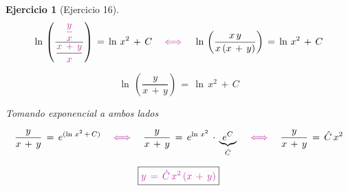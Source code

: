 \documentclass[a4paper,11pt,openany]{book}
\newtheorem{ejer}{Ejercicio}[section]
\begin{document}
\begin{ejer}[Ejercicio 16]
$$\ln\,\left(\dfrac{\textcolor{byzantine}{\dfrac{y}{x}}}{\dfrac{\textcolor{byzantine}{x\,+\,y} }{\textcolor{byzantine}{x}} } \right)\,=\,\ln\,x^{2}\,+\,C \quad \textcolor{byzantine}{\iff} \quad \ln\,\left(\dfrac{x\,y}{x\,(x\,+\,y)} \right)\,=\,\ln\,x^{2}\,+\,C$$ 

$$\ln\,\left(\dfrac{y}{x\,+\,y} \right)\,=\,\ln\,x^{2}\,+\,C $$ 

Tomando exponencial a ambos lados 

 $$\dfrac{y}{x\,+\,y}\,=\,e^{(\ln\,x^{2}\,+\,C)} \quad \textcolor{byzantine}{\iff} \quad \dfrac{y}{x\,+\,y}\,=\,e^{\ln\,x^{2} }\,\cdot\,\underbrace{e^{C}}_{\hat{C}} \quad \textcolor{byzantine}{\iff} \quad \dfrac{y}{x\,+\,y}\,=\,\hat{C}\, x^{2}$$ 

$$\boxed{\textcolor{byzantine}{y\,=\,\hat{C}\, x^{2}\,(x\,+\,y) } } $$ 

\end{ejer} 
\end{document}
